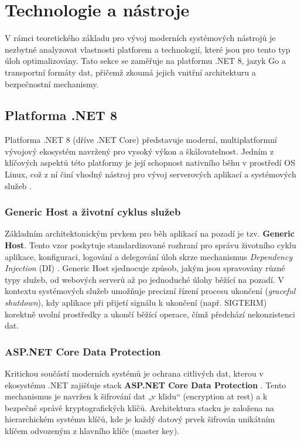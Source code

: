 \section{Technologie a nástroje}
\label{sec:technologie}
V rámci teoretického základu pro vývoj moderních systémových nástrojů je nezbytné analyzovat vlastnosti platforem a technologií, které jsou pro tento typ úloh optimalizovány. Tato sekce se zaměřuje na platformu .NET 8, jazyk Go a transportní formáty dat, přičemž zkoumá jejich vnitřní architekturu a bezpečnostní mechanismy.

\subsection{Platforma .NET 8}
Platforma .NET 8 (dříve .NET Core) představuje moderní, multiplatformní vývojový ekosystém navržený pro vysoký výkon a škálovatelnost. Jedním z klíčových aspektů této platformy je její schopnost nativního běhu v prostředí OS Linux, což z ní činí vhodný nástroj pro vývoj serverových aplikací a systémových služeb \cite{price_csharp}.

\subsubsection{Generic Host a životní cyklus služeb}
Základním architektonickým prvkem pro běh aplikací na pozadí je tzv. \textbf{Generic Host}. Tento vzor poskytuje standardizované rozhraní pro správu životního cyklu aplikace, konfiguraci, logování a delegování úloh skrze mechanismus \textit{Dependency Injection} (DI) \cite{microsoft_generic_host}. Generic Host sjednocuje způsob, jakým jsou spravovány různé typy služeb, od webových serverů až po jednoduché úlohy běžící na pozadí. V kontextu systémových služeb umožňuje precizní řízení procesu ukončení (\textit{graceful shutdown}), kdy aplikace při přijetí signálu k ukončení (např. SIGTERM) korektně uvolní prostředky a ukončí běžící operace, čímž předchází nekonzistenci dat.

\subsubsection{ASP.NET Core Data Protection}
Kritickou součástí moderních systémů je ochrana citlivých dat, kterou v ekosystému .NET zajišťuje stack \textbf{ASP.NET Core Data Protection} \cite{microsoft_data_protection}. Tento mechanismus je navržen k šifrování dat „v klidu“ (encryption at rest) a k bezpečné správě kryptografických klíčů. Architektura stacku je založena na hierarchickém systému klíčů, kde je každý datový prvek šifrován unikátním klíčem odvozeným z hlavního klíče (master key).

